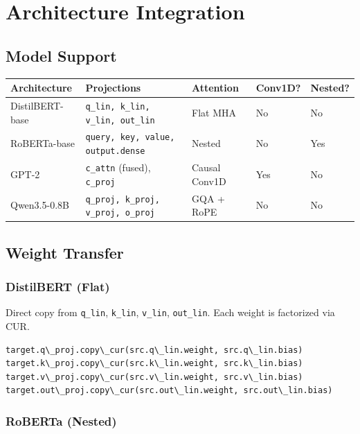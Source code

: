 
\section{Architecture Integration}

\subsection{Model Support}

\begin{table}[H]
\centering
\small
\begin{tabular}{lllll}
\toprule
\textbf{Architecture} & \textbf{Projections} & \textbf{Attention} & \textbf{Conv1D?} & \textbf{Nested?} \\
\midrule
DistilBERT-base & \texttt{q\_lin, k\_lin, v\_lin, out\_lin} & Flat MHA & No & No \\
RoBERTa-base & \texttt{query, key, value, output.dense} & Nested & No & Yes \\
GPT-2 & \texttt{c\_attn} (fused), \texttt{c\_proj} & Causal Conv1D & Yes & No \\
Qwen3.5-0.8B & \texttt{q\_proj, k\_proj, v\_proj, o\_proj} & GQA + RoPE & No & No \\
\bottomrule
\end{tabular}
\end{table}

\subsection{Weight Transfer}

\subsubsection{DistilBERT (Flat)}

Direct copy from \texttt{q\_lin}, \texttt{k\_lin}, \texttt{v\_lin}, \texttt{out\_lin}. Each weight is 
factorized via CUR.

\begin{lstlisting}
target.q\_proj.copy\_cur(src.q\_lin.weight, src.q\_lin.bias)
target.k\_proj.copy\_cur(src.k\_lin.weight, src.k\_lin.bias)
target.v\_proj.copy\_cur(src.v\_lin.weight, src.v\_lin.bias)
target.out\_proj.copy\_cur(src.out\_lin.weight, src.out\_lin.bias)
\end{lstlisting}

\subsubsection{RoBERTa (Nested)}

